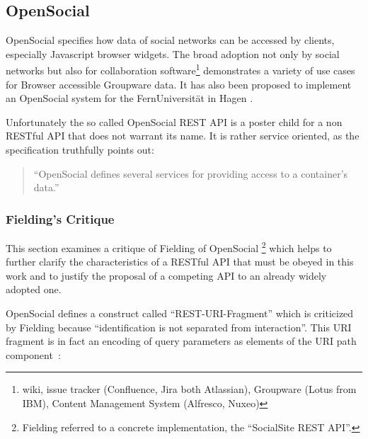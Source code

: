 \documentclass[11pt,a4paper,headsepline,twoside]{scrartcl}		%
\begin{document}
\subsection{OpenSocial}
\label{sec:opensocial-background}


OpenSocial \cite{OSSpec2.0.1} specifies how data of social networks can be
accessed by clients, especially Javascript browser widgets. The broad adoption
not only by social networks but also for collaboration software\footnote{wiki,
  issue tracker (Confluence, Jira both Atlassian), Groupware (Lotus from IBM),
  Content Management System (Alfresco, Nuxeo)} demonstrates a variety of use
cases for Browser accessible Groupware data. It has also been proposed to
implement an OpenSocial system for the FernUniversität in Hagen
\cite{Huebner2009}.

Unfortunately the so called OpenSocial REST API is a poster child for a non
RESTful API that does not warrant its name. It is rather service oriented, as
the specification truthfully points out\cite[Social API Server, sec
2,Services]{OSSpec2.0.1}:
\begin{quote}
  ``OpenSocial defines several services for providing access to a container's data.''
\end{quote}

\subsubsection{Fielding's Critique}
\label{sec:fieldings-critique}

This section examines a critique of Fielding of OpenSocial
\cite{Fielding2008}\footnote{Fielding referred to a concrete implementation, the
  ``SocialSite REST API''.} which helps to further clarify the characteristics
of a RESTful API that must be obeyed in this work and to justify the proposal of
a competing API to an already widely adopted one.

OpenSocial defines a construct called ``REST-URI-Fragment'' which is criticized
by Fielding because ``identification is not separated from interaction''.  This
URI fragment is in fact an encoding of query parameters as elements of the URI
path component~\cite[Core API Server, sec 2.1.1.2.2,
REST-URI-Fragment]{OSSpec2.0.1}:
\end{document}
